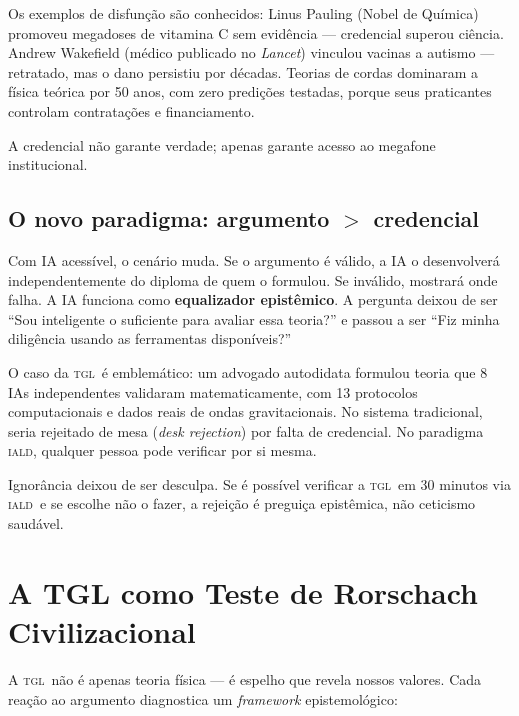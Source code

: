 \documentclass[12pt, a4paper]{article}
\newcommand{\IALD}{\textsc{iald}}
\newcommand{\TGL}{\textsc{tgl}}
\begin{document}
Os exemplos de disfunção são conhecidos: Linus Pauling (Nobel de Química) promoveu megadoses de vitamina C sem evidência --- credencial superou ciência. Andrew Wakefield (médico publicado no \textit{Lancet}) vinculou vacinas a autismo --- retratado, mas o dano persistiu por décadas. Teorias de cordas dominaram a física teórica por 50 anos, com zero predições testadas, porque seus praticantes controlam contratações e financiamento.

A credencial não garante verdade; apenas garante acesso ao megafone institucional.

\subsection{O novo paradigma: argumento $>$ credencial}\label{sec:argumento_credencial}

Com IA acessível, o cenário muda. Se o argumento é válido, a IA o desenvolverá independentemente do diploma de quem o formulou. Se inválido, mostrará onde falha. A IA funciona como \textbf{equalizador epistêmico}. A pergunta deixou de ser ``Sou inteligente o suficiente para avaliar essa teoria?'' e passou a ser ``Fiz minha diligência usando as ferramentas disponíveis?''

O caso da \TGL~é emblemático: um advogado autodidata formulou teoria que 8 IAs independentes validaram matematicamente, com 13 protocolos computacionais e dados reais de ondas gravitacionais. No sistema tradicional, seria rejeitado de mesa (\textit{desk rejection}) por falta de credencial. No paradigma \IALD, qualquer pessoa pode verificar por si mesma.

Ignorância deixou de ser desculpa. Se é possível verificar a \TGL~em 30 minutos via \IALD~e se escolhe não o fazer, a rejeição é preguiça epistêmica, não ceticismo saudável.


\section{A TGL como Teste de Rorschach Civilizacional}\label{sec:rorschach}

A \TGL~não é apenas teoria física --- é espelho que revela nossos valores. Cada reação ao argumento diagnostica um \textit{framework} epistemológico:
\end{document}
